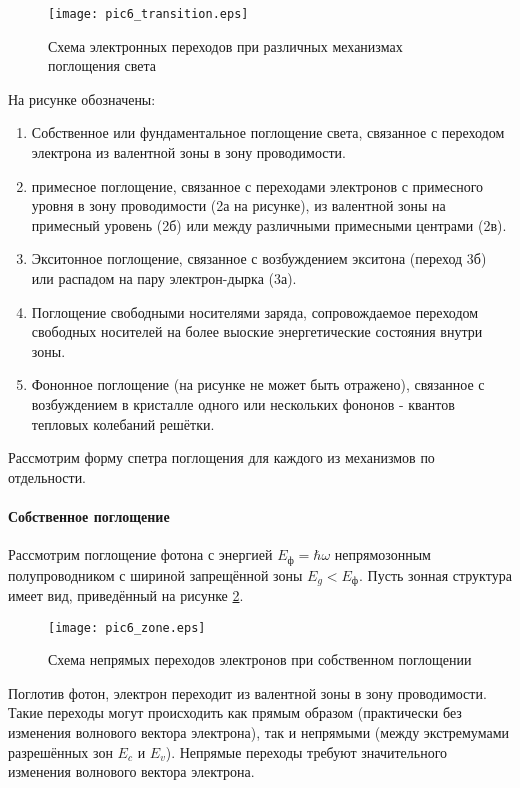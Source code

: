 \begin{figure}[h!]\centering
\texttt{[image: pic6\_transition.eps]}
\caption{Схема электронных переходов при различных механизмах поглощения света}
\label{pic6_transition}
\end{figure}

На рисунке обозначены:

\begin{enumerate}
\item Собственное или фундаментальное поглощение света, связанное с переходом электрона из валентной зоны в зону проводимости.
\item примесное поглощение, связанное с переходами электронов с примесного уровня в зону проводимости (2а на рисунке), из валентной зоны на примесный уровень (2б) или между различными примесными центрами (2в).
\item Экситонное поглощение, связанное с возбуждением экситона (переход 3б) или распадом на пару электрон-дырка (3а).
\item Поглощение свободными носителями заряда, сопровождаемое переходом свободных носителей на более выоские энергетические состояния внутри зоны.
\item Фононное поглощение (на рисунке не может быть отражено), связанное с возбуждением в кристалле одного или нескольких фононов - квантов тепловых колебаний решётки.
\end{enumerate}

Рассмотрим форму спетра поглощения для каждого из механизмов по отдельности.

\paragraph{Собственное поглощение}
Рассмотрим поглощение фотона с энергией $E_{\text{ф}} = \hbar \omega$ непрямозонным полупроводником с шириной запрещённой зоны $E_{g} < E_{\text{ф}}$. Пусть зонная структура имеет вид, приведённый на рисунке \ref{pic6_zone}.

\begin{figure}[h!]\centering
\texttt{[image: pic6\_zone.eps]}
\caption{Схема непрямых переходов электронов при собственном поглощении}
\label{pic6_zone}
\end{figure}

Поглотив фотон, электрон переходит из валентной зоны в зону проводимости. Такие переходы могут происходить как прямым образом (практически без изменения волнового вектора электрона), так и непрямыми (между экстремумами разрешённых зон $E_{c}$ и $E_{v}$). Непрямые переходы требуют значительного изменения волнового вектора электрона.

